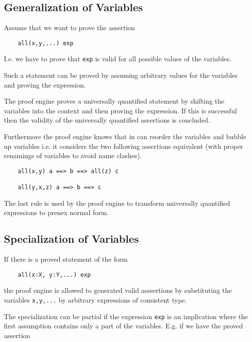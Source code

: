\subsection{Generalization of Variables}

Assume that we want to prove the assertion

\begin{lstlisting}
    all(x,y,...) exp
\end{lstlisting}

I.e. we have to prove that \lstinline!exp! is valid for all possible values of the
variables.

Such a statement can be proved by assuming arbitrary values for the
variables and proving the expression.

The proof engine proves a universally quantified statement by shifting the
variables into the context and then proving the expression. If this is
successful then the validity of the universally quantified assertions is
concluded.

Furthermore the proof engine knows that in can reorder the variables and
bubble up variables i.e. it considers the two following assertions equivalent
(with proper renamings of variables to avoid name clashes).

\begin{lstlisting}
    all(x,y) a ==> b ==> all(z) c

    all(y,x,z) a ==> b ==> c
\end{lstlisting}

The last rule is used by the proof engine to transform universally quantified
expressions to prenex normal form.



\subsection{Specialization of Variables}

If there is a proved statement of the form
\begin{lstlisting}
    all(x:X, y:Y,...) exp
\end{lstlisting}
%
the proof engine is allowed to generated valid asssertions by substituting the
variables \lstinline!x,y,...! by arbitrary expressions of consistent type.

The specialization can be partial if the expression \lstinline!exp! is an
implication where the first assumption contains only a part of the
variables. E.g. if we have the proved assertion

